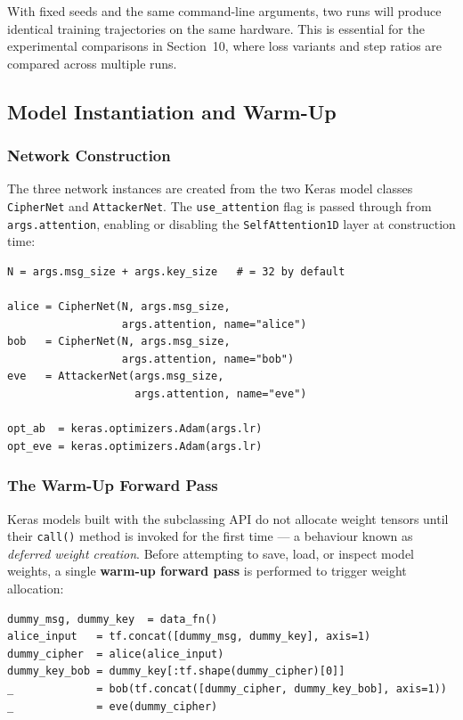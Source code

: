 \documentclass[12pt, a4paper]{article}
\newcommand{\code}[1]{\texttt{\color{CodeRed}#1}}
\begin{document}
With fixed seeds and the same command-line arguments, two runs will
produce identical training trajectories on the same hardware.
This is essential for the experimental comparisons in Section~10,
where loss variants and step ratios are compared across multiple runs.

\subsection{Model Instantiation and Warm-Up}
\label{subsec:model_init}

\subsubsection*{Network Construction}

The three network instances are created from the two Keras model classes
\code{CipherNet} and \code{AttackerNet}. The \code{use\_attention} flag
is passed through from \code{args.attention}, enabling or disabling the
\code{SelfAttention1D} layer at construction time:

\begin{lstlisting}[caption={Network instantiation at the start of \code{main()}}]
N = args.msg_size + args.key_size   # = 32 by default

alice = CipherNet(N, args.msg_size,
                  args.attention, name="alice")
bob   = CipherNet(N, args.msg_size,
                  args.attention, name="bob")
eve   = AttackerNet(args.msg_size,
                    args.attention, name="eve")

opt_ab  = keras.optimizers.Adam(args.lr)
opt_eve = keras.optimizers.Adam(args.lr)
\end{lstlisting}

\subsubsection*{The Warm-Up Forward Pass}

Keras models built with the subclassing API do not allocate weight
tensors until their \code{call()} method is invoked for the first time
--- a behaviour known as \emph{deferred weight creation}. Before
attempting to save, load, or inspect model weights, a single
\textbf{warm-up forward pass} is performed to trigger weight
allocation:

\begin{lstlisting}[caption={Warm-up forward pass to trigger weight allocation}]
dummy_msg, dummy_key  = data_fn()
alice_input   = tf.concat([dummy_msg, dummy_key], axis=1)
dummy_cipher  = alice(alice_input)
dummy_key_bob = dummy_key[:tf.shape(dummy_cipher)[0]]
_             = bob(tf.concat([dummy_cipher, dummy_key_bob], axis=1))
_             = eve(dummy_cipher)
\end{lstlisting}
\end{document}
